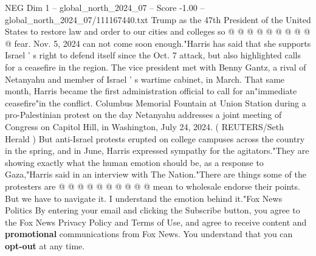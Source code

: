 \begin{textsample}{NEG Dim 1 – global\_north\_2024\_07 – Score -1.00 – global\_north\_2024\_07/111167440.txt}
Trump as the 47th President of the United States to restore law and order to our cities and colleges so @ @ @ @ @ @ @ @ @ @ fear.
Nov. 5, 2024 can not come soon enough."Harris has said that she supports Israel ' s right to defend itself since the Oct. 7 attack, but also highlighted calls for a ceasefire in the region.
The vice president met with Benny Gantz, a rival of Netanyahu and member of Israel ' s wartime cabinet, in March.
That same month, Harris became the first administration official to call for an"immediate ceasefire"in the conflict.
Columbus Memorial Fountain at Union Station during a pro-Palestinian protest on the day Netanyahu addresses a joint meeting of Congress on Capitol Hill, in Washington, July 24, 2024. ( REUTERS/Seth Herald ) But anti-Israel protests erupted on college campuses across the country in the spring, and in June, Harris expressed sympathy for the agitators."They are showing exactly what the human emotion should be, as a response to Gaza,"Harris said in an interview with The Nation."There are things some of the protesters are @ @ @ @ @ @ @ @ @ @ mean to wholesale endorse their points.
But we have to navigate it.
I understand the emotion behind it."Fox News Politics By entering your email and clicking the Subscribe button, you agree to the Fox News Privacy Policy and Terms of Use, and agree to receive content and \textbf{promotional} communications from Fox News.
You understand that you can \textbf{opt-out} at any time.

\end{textsample}
